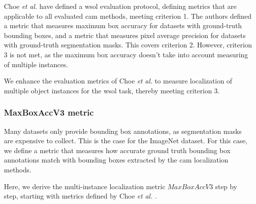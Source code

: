 Choe \textit{et al.} \cite{choe2020evaluating} have defined a \acrshort{wsol} evaluation protocol, defining metrics that are applicable to all evaluated \acrshort{cam} methods, meeting criterion 1. The authors defined a metric that measures maximum box accuracy for datasets with ground-truth bounding boxes, and a metric that measures pixel average precision for datasets with ground-truth segmentation masks. This covers criterion 2. However, criterion 3 is not met, as the maximum box accuracy doesn't take into account measuring of multiple instances.

We enhance the evaluation metrics of Choe \textit{et al.} to measure localization of multiple object instances for the \acrshort{wsol} task, thereby meeting criterion 3.

\subsubsection{MaxBoxAccV3 metric} \label{sec:method_maxboxaccv3}
Many datasets only provide bounding box annotations, as segmentation masks are expensive to collect. This is the case for the ImageNet dataset. For this case, we define a metric that measures how accurate ground truth bounding box annotations match with bounding boxes extracted by the \acrshort{cam} localization methods.

Here, we derive the multi-instance localization metric $MaxBoxAccV3$ step by step, starting with metrics defined by Choe \textit{et al.} \cite{choe2020evaluating}.

